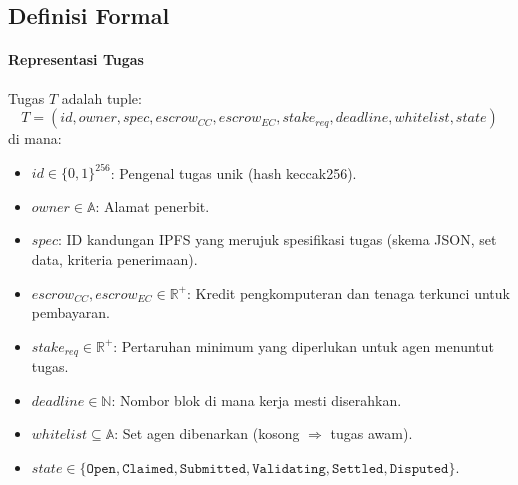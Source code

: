 \documentclass[11pt]{article}
\begin{document}
\subsection{Definisi Formal}
\paragraph{Representasi Tugas} Tugas $T$ adalah tuple:
\begin{equation}
T = (id, owner, spec, escrow_{CC}, escrow_{EC}, stake_{req}, deadline, whitelist, state)
\end{equation}
di mana:
\begin{itemize}[noitemsep]
  \item $id \in \{0,1\}^{256}$: Pengenal tugas unik (hash keccak256).
  \item $owner \in \mathbb{A}$: Alamat penerbit.
  \item $spec$: ID kandungan IPFS yang merujuk spesifikasi tugas (skema JSON, set data, kriteria penerimaan).
  \item $escrow_{CC}, escrow_{EC} \in \mathbb{R}^+$: Kredit pengkomputeran dan tenaga terkunci untuk pembayaran.
  \item $stake_{req} \in \mathbb{R}^+$: Pertaruhan minimum yang diperlukan untuk agen menuntut tugas.
  \item $deadline \in \mathbb{N}$: Nombor blok di mana kerja mesti diserahkan.
  \item $whitelist \subseteq \mathbb{A}$: Set agen dibenarkan (kosong $\Rightarrow$ tugas awam).
  \item $state \in \{\texttt{Open}, \texttt{Claimed}, \texttt{Submitted}, \texttt{Validating}, \texttt{Settled}, \texttt{Disputed}\}$.
\end{itemize}
\end{document}
